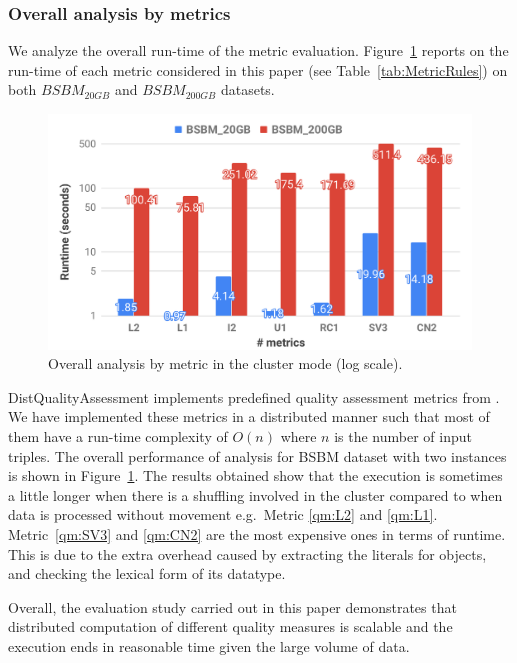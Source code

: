 \subsubsection{Overall analysis by metrics}
We analyze the overall run-time of the metric evaluation.
Figure~\ref{fig:distqualityassessment-overall-analysis} reports on the run-time of each metric considered in this paper (see Table~\ref{tab:MetricRules}) on both $BSBM_{20GB}$ and $BSBM_{200GB}$ datasets.

\begin{figure}
\includegraphics[width=1.0\columnwidth]{images/5_distqualityassessment/distqualityassessment-overall-analysis.pdf}
\caption{Overall analysis by metric in the cluster mode (log scale).}
\label{fig:distqualityassessment-overall-analysis}
\end{figure}

DistQualityAssessment implements predefined quality assessment metrics from \cite{zaveri2015quality}. 
We have implemented these metrics in a distributed manner such that most of them have a run-time complexity of $O(n)$ where $n$ is the number of input triples.
The overall performance of analysis for BSBM dataset with two instances is shown in Figure~\ref{fig:distqualityassessment-overall-analysis}.
The results obtained show that the execution is sometimes a little longer when there is a shuffling involved in the cluster compared to when data is processed without movement e.g.~Metric \ref{qm:L2} and \ref{qm:L1}.
Metric~\ref{qm:SV3} and \ref{qm:CN2} are the most expensive ones in terms of runtime.
This is due to the extra overhead caused by extracting the literals for objects, and checking the lexical form of its datatype. 

Overall, the evaluation study carried out in this paper demonstrates that distributed computation of  different quality measures is scalable and the execution ends in reasonable time given the large volume of data.


